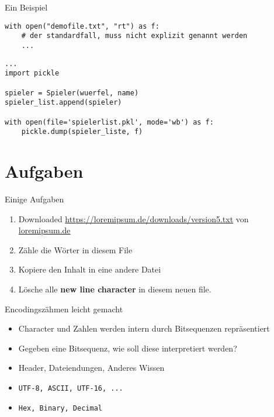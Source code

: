 \begin{frame}[fragile]{Ein Beispiel}
\begin{lstlisting}
with open("demofile.txt", "rt") as f:
	# der standardfall, muss nicht explizit genannt werden
	...
\end{lstlisting}

\begin{lstlisting}
...
import pickle

spieler = Spieler(wuerfel, name)
spieler_list.append(spieler)

with open(file='spielerlist.pkl', mode='wb') as f:
	pickle.dump(spieler_liste, f)
\end{lstlisting}
\end{frame}


\section{Aufgaben}

\begin{frame}[fragile]{Einige Aufgaben}
    \begin{enumerate}
  		\item Downloaded \href{https://loremipsum.de/downloads/version5.txt}{https://loremipsum.de/downloads/version5.txt} von \url{loremipsum.de}
  		\item Zähle die Wörter in diesem File
  		\item Kopiere den Inhalt in eine andere Datei
  		\item Lösche alle \textbf{new line character} in diesem neuen file.
  	\end{enumerate}    
\end{frame}

\begin{frame}{Encodingszähmen leicht gemacht}
	\begin{itemize}
		\item Character und Zahlen werden intern durch Bitsequenzen repräsentiert
		\pause
		\item Gegeben eine Bitsequenz, wie soll diese interpretiert werden?
		\pause
		\item Header, Dateiendungen, Anderes Wissen
		\item \texttt{UTF-8, ASCII, UTF-16, ...}
		\item \texttt{Hex, Binary, Decimal}
	\end{itemize}
\end{frame}

